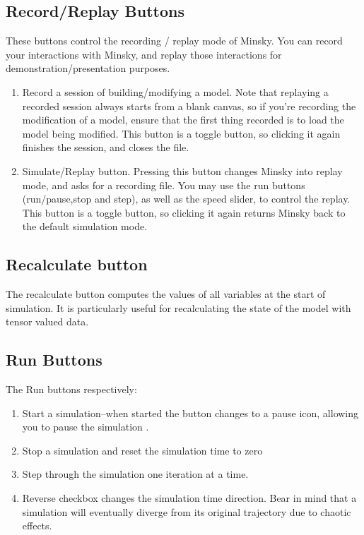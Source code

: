 \subsection{Record/Replay Buttons}
\label{RecReplayButtons}


These buttons control the recording / replay mode of Minsky. You can
record your interactions with Minsky, and replay those interactions
for demonstration/presentation purposes. 

\begin{enumerate}
  \item Record a session of building/modifying a model. Note that
    replaying a recorded session always starts from a blank canvas, so
    if you're recording the modification of a model, ensure that the
    first thing recorded is to load the model being modified. This
    button is a toggle button, so clicking it again finishes the
    session, and closes the file.
  \item Simulate/Replay button. Pressing this button changes Minsky
    into replay mode, and asks for a recording file. You may use the
    run buttons (run/pause,stop and step), as well as the speed
    slider, to control the replay. This button is a toggle button, so
    clicking it again returns Minsky back to the default simulation
    mode.
\end{enumerate}

\subsection{Recalculate button}
\label {Recalculate}


The recalculate button computes the values of all variables at the
start of simulation. It is particularly useful for recalculating the
state of the model with tensor valued data.

\subsection{Run Buttons}
\label{RunButtons}


The Run buttons respectively:
\begin{enumerate}
\item    Start a simulation--when started the button changes to a pause icon,
allowing you to pause the simulation .
\item Stop a simulation and reset the simulation time to zero
\item Step through the simulation one iteration at a time.
\item Reverse checkbox changes the simulation time direction. Bear in
  mind that a simulation will eventually diverge from its original
  trajectory due to chaotic effects.
\end{enumerate}

